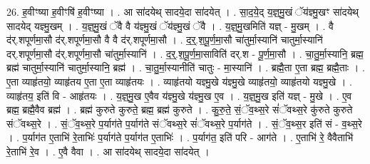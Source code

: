 \documentclass[17pt]{extarticle}
\begin{document}
26. ह॒वीꣳष्या ह॒वीꣳषि॑ ह॒वीꣳष्या । . आ सा॑दयेथ् सादये॒दा सा॑दयेत् । . सा॒द॒ये॒द् य॒ज्ञ्॒मु॒खं ॅय॑ज्ञ्मु॒खꣳ सा॑दयेथ् सादयेद् यज्ञ्मु॒खम् । . य॒ज्ञ्॒मु॒खं ॅवै वै य॑ज्ञ्मु॒खं ॅय॑ज्ञ्मु॒खं ॅवै । . य॒ज्ञ्॒मु॒खमिति॑ यज्ञ् - मु॒खम् । . वै द॑र्.शपूर्णमा॒सौ द॑र्.शपूर्णमा॒सौ वै वै द॑र्.शपूर्णमा॒सौ । . द॒र्॒.श॒पू॒र्ण॒मा॒सौ चा॑तुर्मा॒स्यानि॑ चातुर्मा॒स्यानि॑ दर्.शपूर्णमा॒सौ द॑र्.शपूर्णमा॒सौ चा॑तुर्मा॒स्यानि॑ । . द॒र्॒.श॒पू॒र्ण॒मा॒साविति॑ दर्.श - पू॒र्ण॒मा॒सौ । . चा॒तु॒र्मा॒स्यानि॒ ब्रह्म॒ ब्रह्म॑ चातुर्मा॒स्यानि॑ चातुर्मा॒स्यानि॒ ब्रह्म॑ । . चा॒तु॒र्मा॒स्यानीति॑ चातुः - मा॒स्यानि॑ । . ब्रह्मै॒ता ए॒ता ब्रह्म॒ ब्रह्मै॒ताः । . ए॒ता व्याहृ॑तयो॒ व्याहृ॑तय ए॒ता ए॒ता व्याहृ॑तयः । . व्याहृ॑तयो यज्ञ्मु॒खे य॑ज्ञ्मु॒खे व्याहृ॑तयो॒ व्याहृ॑तयो यज्ञ्मु॒खे । . व्याहृ॑तय॒ इति॑ वि - आहृ॑तयः । . य॒ज्ञ्॒मु॒ख ए॒वैव य॑ज्ञ्मु॒खे य॑ज्ञ्मु॒ख ए॒व । . य॒ज्ञ्॒मु॒ख इति॑ यज्ञ् - मु॒खे । . ए॒व ब्रह्म॒ ब्रह्मै॒वैव ब्रह्म॑ । . ब्रह्म॑ कुरुते कुरुते॒ ब्रह्म॒ ब्रह्म॑ कुरुते । . कु॒रु॒ते॒ सं॒ॅव॒थ्स॒रे सं॑ॅवथ्स॒रे कु॑रुते कुरुते संॅवथ्स॒रे । . सं॒ॅव॒थ्स॒रे प॒र्याग॑ते प॒र्याग॑ते संॅवथ्स॒रे सं॑ॅवथ्स॒रे प॒र्याग॑ते । . सं॒ॅव॒थ्स॒र इति॑ सं - व॒थ्स॒रे । . प॒र्याग॑त ए॒ताभि॑ रे॒ताभिः॑ प॒र्याग॑ते प॒र्याग॑त ए॒ताभिः॑ । . प॒र्याग॑त॒ इति॑ परि - आग॑ते । . ए॒ताभि॑ रे॒ वैवैताभि॑ रे॒ताभि॑ रे॒व । . ए॒वै वैवा । . आ सा॑दयेथ् सादये॒दा सा॑दयेत् । \newline
\end{document}
